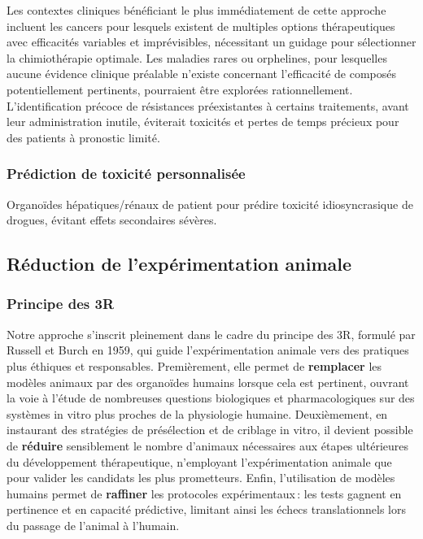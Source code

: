 Les contextes cliniques bénéficiant le plus immédiatement de cette approche incluent les cancers pour lesquels existent de multiples options thérapeutiques avec efficacités variables et imprévisibles, nécessitant un guidage pour sélectionner la chimiothérapie optimale. Les maladies rares ou orphelines, pour lesquelles aucune évidence clinique préalable n'existe concernant l'efficacité de composés potentiellement pertinents, pourraient être explorées rationnellement. L'identification précoce de résistances préexistantes à certains traitements, avant leur administration inutile, éviterait toxicités et pertes de temps précieux pour des patients à pronostic limité.

\subsubsection{Prédiction de toxicité personnalisée}

Organoïdes hépatiques/rénaux de patient pour prédire toxicité idiosyncrasique de drogues, évitant effets secondaires sévères.

\subsection{Réduction de l'expérimentation animale}

\subsubsection{Principe des 3R}

Notre approche s’inscrit pleinement dans le cadre du principe des 3R, formulé par Russell et Burch en 1959, qui guide l’expérimentation animale vers des pratiques plus éthiques et responsables. Premièrement, elle permet de \textbf{remplacer} les modèles animaux par des organoïdes humains lorsque cela est pertinent, ouvrant la voie à l’étude de nombreuses questions biologiques et pharmacologiques sur des systèmes in vitro plus proches de la physiologie humaine. Deuxièmement, en instaurant des stratégies de présélection et de criblage in vitro, il devient possible de \textbf{réduire} sensiblement le nombre d’animaux nécessaires aux étapes ultérieures du développement thérapeutique, n’employant l’expérimentation animale que pour valider les candidats les plus prometteurs. Enfin, l’utilisation de modèles humains permet de \textbf{raffiner} les protocoles expérimentaux : les tests gagnent en pertinence et en capacité prédictive, limitant ainsi les échecs translationnels lors du passage de l’animal à l’humain.

